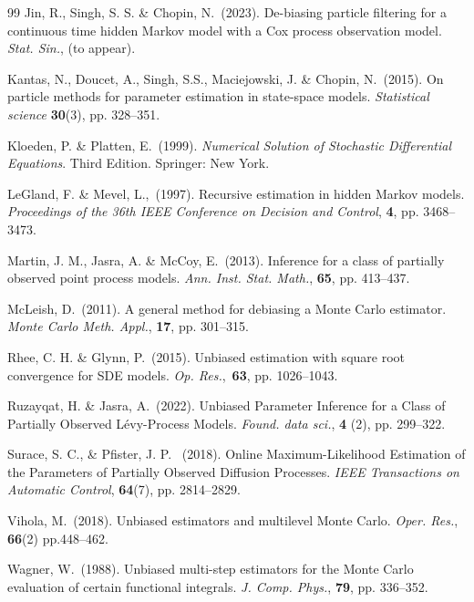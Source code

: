 \documentclass[english]{article}
\begin{document}
\begin{thebibliography}{99}
{\sc Jin}, R., {\sc Singh}, S. S. \& {\sc Chopin}, N.~(2023). De-biasing particle filtering for a continuous time hidden Markov model with a Cox process observation model.
\emph{Stat. Sin.}, (to appear).

{\sc Kantas, N., Doucet, A., Singh, S.S., Maciejowski, J. \& Chopin, N.}~(2015). On particle methods for parameter estimation in state-space models. \emph{Statistical science} {\bf 30}(3), pp. 328--351.

{\sc Kloeden}, P. \& {\sc Platten}, E.~(1999). \emph{Numerical Solution of Stochastic Differential Equations}.
Third Edition. Springer: New York.

{\sc LeGland}, F. \& {\sc Mevel}, L.,~(1997). Recursive estimation in hidden Markov models. \emph{Proceedings of the 36th IEEE Conference on Decision and Control}, {\bf 4}, pp. 3468--3473.

{\sc Martin}, J. M., {\sc Jasra}, A. \& {\sc McCoy}, E.~(2013).
Inference for a class of partially observed point process models. \emph{Ann. Inst. Stat. Math.}, {\bf 65}, pp. 413--437.

{\sc McLeish}, D.~(2011). A general method for debiasing a Monte Carlo estimator. \emph{Monte Carlo Meth. Appl.}, {\bf 17}, pp. 301--315.

{\sc Rhee}, C. H. \& {\sc Glynn}, P.~(2015). Unbiased estimation with square root convergence for SDE models. \emph{Op. Res.},~{\bf 63}, pp. 1026--1043. 

{\sc Ruzayqat, H. \& Jasra, A.}~(2022). Unbiased Parameter Inference for a Class of Partially Observed L\'{e}vy-Process Models. {\it Found. data sci.}, {\bf 4} (2), pp. 299--322.

{\sc Surace, S. C., \& Pfister, J. P.}~ (2018). Online Maximum-Likelihood Estimation of the Parameters of Partially Observed Diffusion Processes. \emph{IEEE Transactions on Automatic Control}, {\bf 64}(7), pp. 2814--2829.

{\sc Vihola, M.}~(2018). Unbiased estimators and multilevel Monte Carlo. \emph{Oper. Res.}, {\bf 66}(2) pp.448--462.

{\sc Wagner}, W.~(1988). Unbiased multi-step estimators for the Monte Carlo evaluation of certain functional integrals. \emph{J. Comp. Phys.}, {\bf 79}, pp. 336--352.



\end{thebibliography}
\end{document}

